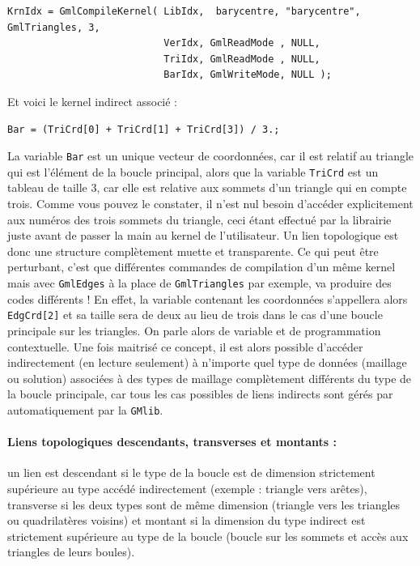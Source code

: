 \documentclass[a4paper,12pt]{article}
\begin{document}
\begin{tt}
\begin{verbatim}
KrnIdx = GmlCompileKernel( LibIdx,  barycentre, "barycentre", GmlTriangles, 3,
                           VerIdx, GmlReadMode , NULL,
                           TriIdx, GmlReadMode , NULL,
                           BarIdx, GmlWriteMode, NULL );
\end{verbatim}
\end{tt}
\normalfont

Et voici le kernel indirect associé :

\begin{tt}
\begin{verbatim}
Bar = (TriCrd[0] + TriCrd[1] + TriCrd[3]) / 3.;
\end{verbatim}
\end{tt}
\normalfont

La variable {\tt Bar} est un unique vecteur de coordonnées, car il est relatif au triangle qui est l'élément de la boucle principal, alors que la variable {\tt TriCrd} est un tableau de taille 3, car elle est relative aux sommets d'un triangle qui en compte trois.
Comme vous pouvez le constater, il n'est nul besoin d'accéder explicitement aux numéros des trois sommets du triangle, ceci étant effectué par la librairie juste avant de passer la main au kernel de l'utilisateur.
Un lien topologique est donc une structure complètement muette et transparente.
Ce qui peut être perturbant, c'est que différentes commandes de compilation d'un même kernel mais avec {\tt GmlEdges} à la place de {\tt GmlTriangles} par exemple, va produire des codes différents !
En effet, la variable contenant les coordonnées s'appellera alors {\tt EdgCrd[2]} et sa taille sera de deux au lieu de trois dans le cas d'une boucle principale sur les triangles.
On parle alors de variable et de programmation contextuelle.
Une fois maitrisé ce concept, il est alors possible d'accéder indirectement (en lecture seulement) à n'importe quel type de données (maillage ou solution) associées à des types de maillage complètement différents du type de la boucle principale, car tous les cas possibles de liens indirects sont gérés par automatiquement par la {\tt GMlib}.

\paragraph{Liens topologiques descendants, transverses et montants :} un lien est descendant si le type de la boucle est de dimension strictement supérieure au type accédé indirectement (exemple : triangle vers arêtes), transverse si les deux types sont de même dimension (triangle vers les triangles ou quadrilatères voisins) et montant si la dimension du type indirect est strictement supérieure au type de la boucle (boucle sur les sommets et accès aux triangles de leurs boules).
\end{document}
